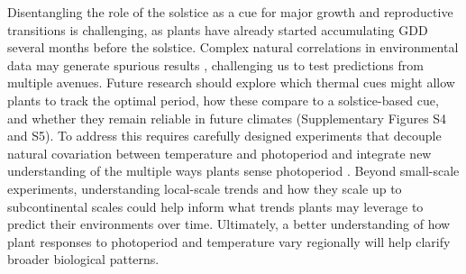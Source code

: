 \documentclass[11pt,letter]{article}
\begin{document}
Disentangling the role of the solstice as a cue for major growth and reproductive transitions is challenging, as plants have already started accumulating GDD several months before the solstice.
Complex natural correlations in environmental data may generate spurious results \citep[e.g.][]{Gao2024}, challenging us to test predictions from multiple avenues. %
Future research should explore which thermal cues might allow plants to track the optimal period, how these compare to a solstice-based cue, and whether they remain reliable in future climates (Supplementary Figures S4 and S5).
To address this requires carefully designed experiments that decouple natural covariation between temperature and photoperiod \citep{Buonaiuto2023} and integrate new understanding of the multiple ways plants sense photoperiod \citep{wang2024plants}.  
Beyond small-scale experiments, understanding local-scale trends and how they scale up to subcontinental scales could help inform what trends plants may leverage to predict their environments over time. 
Ultimately, a better understanding of how plant responses to photoperiod and temperature vary regionally will help clarify broader biological patterns.
\end{document}
